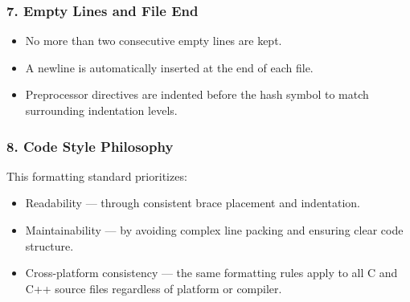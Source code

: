 \subsubsection*{7. Empty Lines and File End}
\begin{itemize}
    \item
    No more than two consecutive empty lines are kept.
    \item
    A newline is automatically inserted at the end of each file.
    \item
    Preprocessor directives are indented before the hash symbol to match surrounding indentation levels.
    \end{itemize}
    \subsubsection*{8. Code Style Philosophy}
    This formatting standard prioritizes:
    \begin{itemize}
    \item
    Readability — through consistent brace placement and indentation.
    \item
    Maintainability — by avoiding complex line packing and ensuring clear code structure.
    \item
    Cross-platform consistency — the same formatting rules apply to all C and C++ source files regardless of platform or compiler.
\end{itemize}